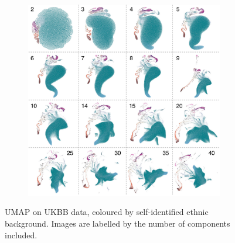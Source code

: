 \documentclass[12pt]{pnas-new}
\begin{document}
\begin{figure}
    \centering
    \begin{subfigure}{0.95\textwidth}
    \includegraphics[width=0.95\textwidth]{images/default_clean_size10_alpha60_flip.jpeg}
    \end{subfigure}
    \caption{UMAP on UKBB data, coloured by self-identified ethnic background. Images are labelled by the number of components included.}
    \label{fig:supp_montage_ukbb_eth}
\end{figure}
\end{document}
